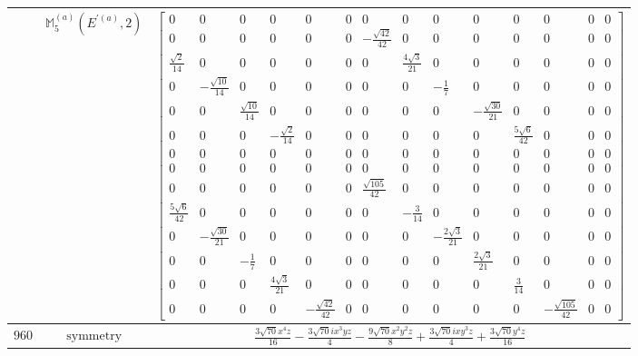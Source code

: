 \documentclass[fleqn,8pt,landscape]{jsarticle}
\begin{document}
\begin{longtable}{ccc}
$  $ & $ \mathbb{M}_{5}^{(a)}(E^{\prime(a)},2) $ & $ \begin{bmatrix} 0 & 0 & 0 & 0 & 0 & 0 & 0 & 0 & 0 & 0 & 0 & 0 & 0 & 0 \\ 0 & 0 & 0 & 0 & 0 & 0 & - \frac{\sqrt{42}}{42} & 0 & 0 & 0 & 0 & 0 & 0 & 0 \\ \frac{\sqrt{2}}{14} & 0 & 0 & 0 & 0 & 0 & 0 & \frac{4 \sqrt{3}}{21} & 0 & 0 & 0 & 0 & 0 & 0 \\ 0 & - \frac{\sqrt{10}}{14} & 0 & 0 & 0 & 0 & 0 & 0 & - \frac{1}{7} & 0 & 0 & 0 & 0 & 0 \\ 0 & 0 & \frac{\sqrt{10}}{14} & 0 & 0 & 0 & 0 & 0 & 0 & - \frac{\sqrt{30}}{21} & 0 & 0 & 0 & 0 \\ 0 & 0 & 0 & - \frac{\sqrt{2}}{14} & 0 & 0 & 0 & 0 & 0 & 0 & \frac{5 \sqrt{6}}{42} & 0 & 0 & 0 \\ 0 & 0 & 0 & 0 & 0 & 0 & 0 & 0 & 0 & 0 & 0 & 0 & 0 & 0 \\ 0 & 0 & 0 & 0 & 0 & 0 & 0 & 0 & 0 & 0 & 0 & 0 & 0 & 0 \\ 0 & 0 & 0 & 0 & 0 & 0 & \frac{\sqrt{105}}{42} & 0 & 0 & 0 & 0 & 0 & 0 & 0 \\ \frac{5 \sqrt{6}}{42} & 0 & 0 & 0 & 0 & 0 & 0 & - \frac{3}{14} & 0 & 0 & 0 & 0 & 0 & 0 \\ 0 & - \frac{\sqrt{30}}{21} & 0 & 0 & 0 & 0 & 0 & 0 & - \frac{2 \sqrt{3}}{21} & 0 & 0 & 0 & 0 & 0 \\ 0 & 0 & - \frac{1}{7} & 0 & 0 & 0 & 0 & 0 & 0 & \frac{2 \sqrt{3}}{21} & 0 & 0 & 0 & 0 \\ 0 & 0 & 0 & \frac{4 \sqrt{3}}{21} & 0 & 0 & 0 & 0 & 0 & 0 & \frac{3}{14} & 0 & 0 & 0 \\ 0 & 0 & 0 & 0 & - \frac{\sqrt{42}}{42} & 0 & 0 & 0 & 0 & 0 & 0 & - \frac{\sqrt{105}}{42} & 0 & 0 \end{bmatrix} $ \\ \hline
$ 960 $ & $ \text{symmetry} $ & $ \frac{3 \sqrt{70} x^{4} z}{16} - \frac{3 \sqrt{70} i x^{3} y z}{4} - \frac{9 \sqrt{70} x^{2} y^{2} z}{8} + \frac{3 \sqrt{70} i x y^{3} z}{4} + \frac{3 \sqrt{70} y^{4} z}{16} $ \\

\end{longtable}
\end{document}
